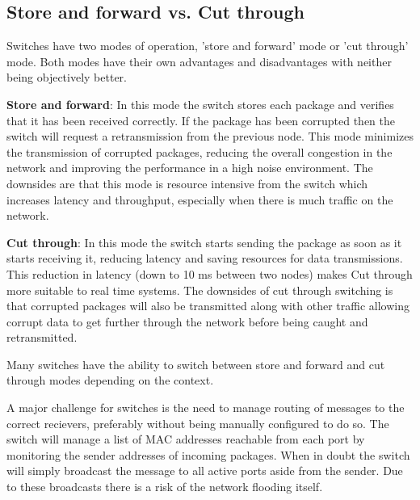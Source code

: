 \subsection{Store and forward vs. Cut through}

Switches have two modes of operation, 'store and forward' mode or 'cut through' mode. Both modes have their own advantages and disadvantages with neither being objectively better. 

\noindent \textbf{Store and forward}: In this mode the switch stores each package and verifies that it has been received correctly. If the package has been corrupted then the switch will request a retransmission from the previous node. This mode minimizes the transmission of corrupted packages, reducing the overall congestion in the network and improving the performance in a high noise environment. The downsides are that this mode is resource intensive from the switch which increases latency and throughput, especially when there is much traffic on the network.

\noindent \textbf{Cut through}: In this mode the switch starts sending the package as soon as it starts receiving it, reducing latency and saving resources for data transmissions. This reduction in latency (down to 10 ms between two nodes) makes Cut through more suitable to real time systems. The downsides of cut through switching is that corrupted packages will also be transmitted along with other traffic allowing corrupt data to get further through the network before being caught and retransmitted. 

\noindent Many switches have the ability to switch between store and forward and cut through modes depending on the context.

\noindent A major challenge for switches is the need to manage routing of messages to the correct recievers, preferably without being manually configured to do so. The switch will manage a list of MAC addresses reachable from each port by monitoring the sender addresses of incoming packages. When in doubt the switch will simply broadcast the message to all active ports aside from the sender. Due to these broadcasts there is a risk of the network flooding itself.

